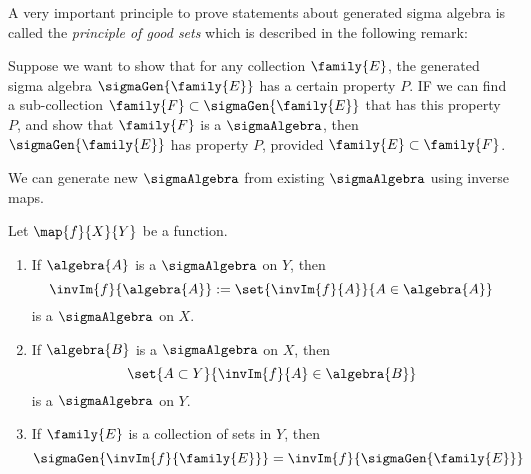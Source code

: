 A very important principle to prove statements about generated sigma algebra is called the
\emph{principle of good sets} which is described in the following remark:
\begin{Remark}[name=Principle of good sets]\label{rmk:prin_good_sets}
    Suppose we want to show that for any collection $\family{E}$, the generated sigma algebra
    $\sigmaGen{\family{E}}$ has a certain property $P$. IF we can find a sub-collection $\family{F}
    \subset \sigmaGen{\family{E}}$ that has this property $P$, and show that $\family{F}$ is a
    $\sigmaAlgebra$, then $\sigmaGen{\family{E}}$ has property $P$, provided
    $\family{E}\subset\family{F}$.
\end{Remark}
We can generate new $\sigmaAlgebra$ from existing $\sigmaAlgebra$ using inverse maps.
\begin{Theorem}[name=Pre-Image $\sigmaAlgebra$]\label{thm:pre_img_sigma}
    Let $\map{f}{X}{Y}$ be a function.
    \begin{enumerate}
	\item
	    If $\algebra{A}$ is a $\sigmaAlgebra$ on $Y$, then
	    \begin{equation*}
		\invIm{f}{\algebra{A}} := \set{\invIm{f}{A}}{A \in \algebra{A}}
	    \end{equation*}
	    is a $\sigmaAlgebra$ on $X$.
	\item
	    If $\algebra{B}$ is a $\sigmaAlgebra$ on $X$, then
	    \begin{equation*}
		\set{A\subset Y}{\invIm{f}{A}\in\algebra{B}}
	    \end{equation*}
	    is a $\sigmaAlgebra$ on $Y$.
	\item
	    If $\family{E}$ is a collection of sets in $Y$, then
	    \begin{equation*}
		\sigmaGen{\invIm{f}{\family{E}}} = \invIm{f}{\sigmaGen{\family{E}}}
	    \end{equation*}
    \end{enumerate}
\end{Theorem}
